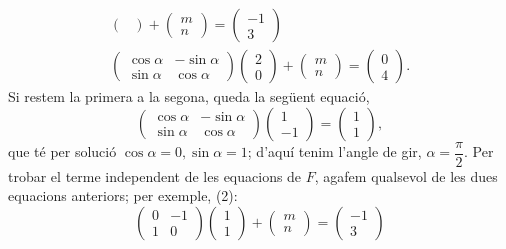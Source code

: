 \documentclass[10pt]{article}
\begin{document}
\begin{itemize}
\begin{align}
\begin{pmatrix}
        \end{pmatrix}+\begin{pmatrix}m\\ n
        \end{pmatrix}=\begin{pmatrix}-1\\ 3
        \end{pmatrix}\\
        \begin{pmatrix}
        \cos{\alpha} & -\sin{\alpha}\\
        \sin{\alpha} & \cos{\alpha}
        \end{pmatrix}\begin{pmatrix}2\\ 0
        \end{pmatrix}+\begin{pmatrix}m\\ n
        \end{pmatrix}=\begin{pmatrix}0\\ 4
        \end{pmatrix}.
    \end{align}
    Si restem la primera a la segona, queda la següent equació,
    \[
        \begin{pmatrix}
        \cos{\alpha} & -\sin{\alpha}\\
        \sin{\alpha} & \cos{\alpha}
        \end{pmatrix}\begin{pmatrix}1\\ -1
        \end{pmatrix}=\begin{pmatrix}1\\ 1
        \end{pmatrix},
    \]
    que té per solució $\cos{\alpha}=0,\sin{\alpha}=1$; d'aquí tenim l'angle de gir, $\alpha=\dfrac{\pi}{2}$. Per trobar el terme independent de les equacions de $F$, agafem qualsevol de les dues equacions anteriors; per exemple, (2):
    \[    
        \begin{pmatrix}
        0 & -1\\
        1 & 0
        \end{pmatrix}\begin{pmatrix}1\\ 1
        \end{pmatrix}+\begin{pmatrix}m\\ n
        \end{pmatrix}=\begin{pmatrix}-1\\ 3

\end{pmatrix}\]
\end{itemize}
\end{document}
